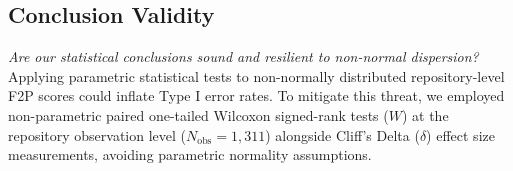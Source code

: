 \subsection{Conclusion Validity}
\textit{Are our statistical conclusions sound and resilient to non-normal dispersion?}
Applying parametric statistical tests to non-normally distributed repository-level F2P scores could inflate Type I error rates. To mitigate this threat, we employed non-parametric paired one-tailed Wilcoxon signed-rank tests ($W$) at the repository observation level ($N_{\text{obs}} = 1,311$) alongside Cliff's Delta ($\delta$) effect size measurements, avoiding parametric normality assumptions.
